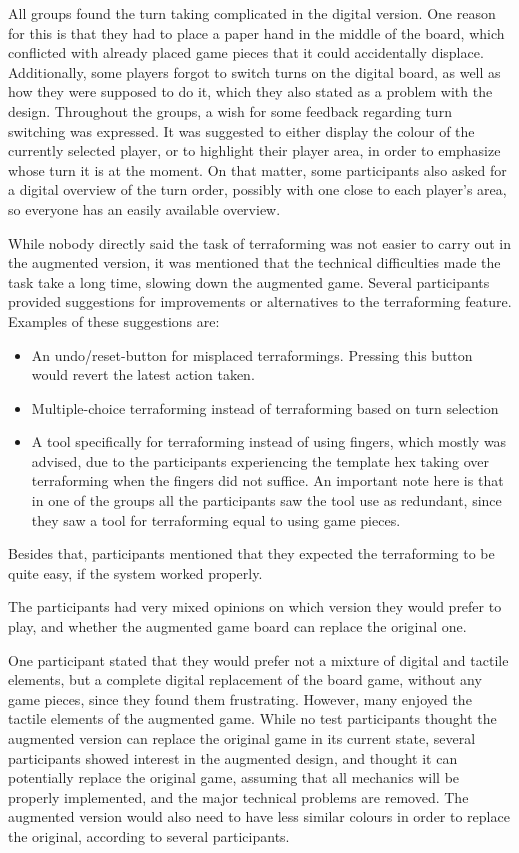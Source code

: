 All groups found the turn taking complicated in the digital version. One reason for this is that they had to place a paper hand in the middle of the board, which conflicted with already placed game pieces that it could accidentally displace. Additionally, some players forgot to switch turns on the digital board, as well as how they were supposed to do it, which they also stated as a problem with the design. Throughout the groups, a wish for some feedback regarding turn switching was expressed. It was suggested to either display the colour of the currently selected player, or to highlight their player area, in order to emphasize whose turn it is at the moment. On that matter, some participants also asked for a digital overview of the turn order, possibly with one close to each player’s area, so everyone has an easily available overview. 

While nobody directly said the task of terraforming was not easier to carry out in the augmented version, it was mentioned that the technical difficulties made the task take a long time, slowing down the augmented game. Several participants provided suggestions for improvements or alternatives to the terraforming feature. Examples of these suggestions are:
\begin{itemize}
\item An undo/reset-button for misplaced terraformings. Pressing this button would revert the latest action taken.
\item Multiple-choice terraforming instead of terraforming based on turn selection
\item A tool specifically for terraforming instead of using fingers, which mostly was advised, due to the participants experiencing the template hex taking over terraforming when the fingers did not suffice. An important note here is that in one of the groups all the participants saw the tool use as redundant, since they saw a tool for terraforming equal to using game pieces.
\end{itemize}
Besides that, participants mentioned that they expected the terraforming to be quite easy, if the system worked properly. 

The participants had very mixed opinions on which version they would prefer to play, and whether the augmented game board can replace the original one.

One participant stated that they would prefer not a mixture of digital and tactile elements, but a complete digital replacement of the board game, without any game pieces, since they found them frustrating. However, many enjoyed the tactile elements of the augmented game. While no test participants thought the augmented version can replace the original game in its current state, several participants showed interest in the augmented design, and thought it can potentially replace the original game, assuming that all mechanics will be properly implemented, and the major technical problems are removed. The augmented version would also need to have less similar colours in order to replace the original, according to several participants.

